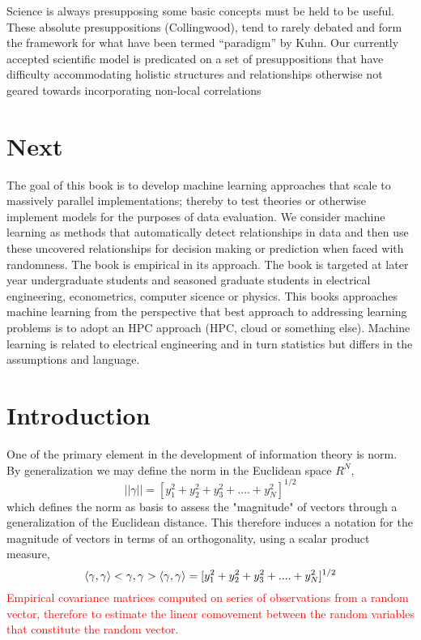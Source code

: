 \documentclass[7pt]{article}
\begin{document}
\newpage

Science is always presupposing some basic concepts must be held to be useful. These absolute presuppositions (Collingwood), tend to rarely debated and form the framework for what have been termed “paradigm” by Kuhn. Our currently accepted scientific model is predicated on a set of presuppositions that have difficulty accommodating holistic structures and relationships otherwise not geared towards incorporating non-local correlations

\section*{Next}
The goal of this book is to develop machine learning approaches that scale to massively parallel implementations; thereby to test theories or otherwise implement models for the purposes of data evaluation. We consider machine learning as  methods that automatically detect relationships in data and then use these uncovered relationships for decision making or prediction when faced with randomness. The book is empirical in its approach. The book is targeted at later year undergraduate students and seasoned graduate students in electrical engineering, econometrics, computer sicence or physics. This books approaches machine learning from the perspective that best approach to addressing learning problems is to adopt an HPC approach (HPC, cloud or something else). Machine learning is related to electrical engineering and in turn statistics but differs in the assumptions and language.
\section*{Introduction}
One of the primary element in the development of information theory is norm. By generalization we may define the norm in the Euclidean space $R^N$,
\begin{equation}
||\gamma|| = [y^2_1 + y^2_2 + y^2_3 + .... + y^2_N]^{1/2}
\end{equation}
which defines the norm as basis to assess the "magnitude" of vectors through a generalization of the Euclidean distance. This therefore induces a notation for the magnitude of vectors in terms of an orthogonality, using a scalar product measure,
\begin{equation}
\inn{\gamma,\gamma}
<\gamma,\gamma> \expval{\gamma,\gamma} = [y^2_1 + y^2_2 + y^2_3 + .... + y^2_N]^{1/2}
\end{equation}
\textcolor{red}{Empirical covariance matrices computed on series of observations from a random vector, therefore to estimate the linear comovement between the random variables that constitute the random vector.}
\end{document}
